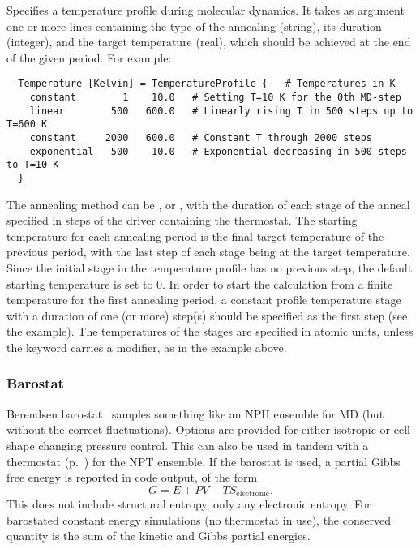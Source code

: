 Specifies a temperature profile during molecular dynamics. It takes as
argument one or more lines containing the type of the annealing
(string), its duration (integer), and the target temperature (real),
which should be achieved at the end of the given period. For example:
\begin{verbatim}
  Temperature [Kelvin] = TemperatureProfile {   # Temperatures in K
    constant        1    10.0   # Setting T=10 K for the 0th MD-step
    linear        500   600.0   # Linearly rising T in 500 steps up to T=600 K
    constant     2000   600.0   # Constant T through 2000 steps
    exponential   500    10.0   # Exponential decreasing in 500 steps to T=10 K
  }
\end{verbatim}
The annealing method can be ,  or
, with the duration of each stage of the anneal
specified in steps of the driver containing the thermostat. The
starting temperature for each annealing period is the final target
temperature of the previous period, with the last step of each stage
being at the target temperature. Since the initial stage in the
temperature profile has no previous step, the default starting
temperature is set to 0.  In order to start the calculation from a finite
temperature for the first annealing period, a constant profile
temperature stage with a duration of one (or more) step(s) should be
specified as the first step (see the example).  The temperatures of
the stages are specified in atomic units, unless the 
keyword carries a modifier, as in the example above.

\subsubsection{Barostat}
\label{sec:dftbp.Barostat}

Berendsen barostat~\cite{berendsen-JCP-81-3684} samples something like an
NPH ensemble for MD (but without the correct
fluctuations). Options are provided for either isotropic or cell shape changing
pressure control. This can also be used in tandem with a thermostat
(p.~) for the NPT ensemble. If the barostat
is used, a partial Gibbs free energy is reported in code output, of the form
\begin{equation*}
  G = E + PV - TS_\mathrm{electronic}.
\end{equation*}
This does not include structural entropy, only any electronic entropy. For
barostated constant energy simulations (no thermostat in use), the conserved
quantity is the sum of the kinetic and Gibbs partial energies.

